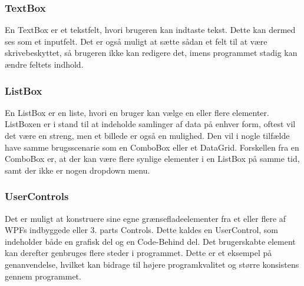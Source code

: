 \subsubsection*{TextBox}
En TextBox er et tekstfelt, hvori brugeren kan indtaste tekst. 
Dette kan dermed ses som et inputfelt. 
Det er også muligt at sætte sådan et felt til at være skrivebeskyttet, så brugeren ikke kan redigere det, imens programmet stadig kan ændre feltets indhold.

\subsubsection*{ListBox}
En ListBox er en liste, hvori en bruger kan vælge en eller flere elementer.
ListBoxen er i stand til at indeholde samlinger af data på enhver form, oftest vil det være en streng, men et billede er også en mulighed.
Den vil i nogle tilfælde have samme brugsscenarie som en ComboBox eller et DataGrid. 
Forskellen fra en ComboBox er, at der kan være flere synlige elementer i en ListBox på samme tid, samt der ikke er nogen dropdown menu.

\subsubsection*{UserControls}
Det er muligt at konstruere sine egne grænsefladeelementer fra et eller flere af WPFs indbyggede eller 3. parts Controls.
Dette kaldes en UserControl, som indeholder både en grafisk del og en Code-Behind del.
Det brugerskabte element kan derefter genbruges flere steder i programmet.
Dette er et eksempel på genanvendelse, hvilket kan bidrage til højere programkvalitet og større konsistens gennem programmet. 
